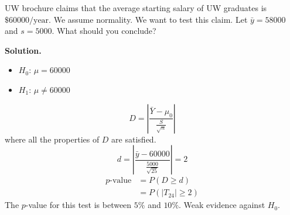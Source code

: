 \begin{exbox}
    \begin{example}
        UW brochure claims that the average starting salary of UW graduates
        is $ \$60000\text{/year} $. We assume normality. We want to test this claim.
        Let $ \bar{y}=58000 $ and $ s=5000 $. What should you conclude?

        \textbf{Solution.}
        \begin{itemize}
            \item $ H_0 $: $ \mu=60000 $
            \item $ H_1 $: $ \mu\neq 60000 $
        \end{itemize}
        \[ D=\left|\frac{\bar{Y}-\mu_0}{\frac{S}{\sqrt{n}}}\right| \]
        where all the properties of $ D $ are satisfied.
        \[ d=\left|\frac{\bar{y}-60000}{\frac{5000}{\sqrt{25}}}\right|=2 \]
        \begin{align*}
            p\text{-value}
             & =P(D\geqslant d)        \\
             & =P(|T_{24}|\geqslant 2)
        \end{align*}
        The $ p $-value for this test is between $ 5\% $ and $ 10\% $. Weak evidence
        against $ H_0 $.
    \end{example}
\end{exbox}
